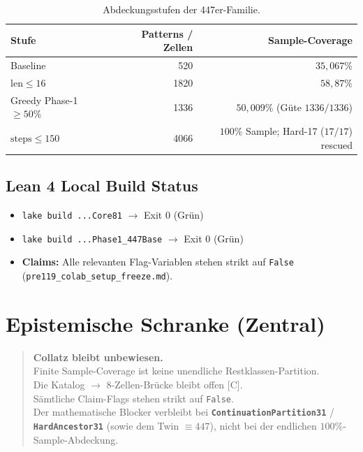 \documentclass[11pt,a4paper]{article}
\theoremstyle{definition}
\theoremstyle{remark}
\begin{document}
	\begin{table}[h!]
		\centering
		\begin{tabular}{l r r}
			\toprule
			\textbf{Stufe} & \textbf{Patterns / Zellen} & \textbf{Sample-Coverage} \\
			\midrule
			Baseline & 520 & \textbf{$35{,}067\%$} \\
			$\mathrm{len} \le 16$ & 1820 & \textbf{$58{,}87\%$} \\
			Greedy Phase-1 $\ge 50\%$ & 1336 & \textbf{$50{,}009\%$} (Güte $1336/1336$) \\
			$\mathrm{steps} \le 150$ & 4066 & \textbf{$100\%$} Sample; Hard-17 ($17/17$) rescued \\
			\bottomrule
		\end{tabular}
		\caption{Abdeckungsstufen der 447er-Familie.}
	\end{table}
	
	\subsection{Lean 4 Local Build Status}
	\begin{itemize}
		\item \texttt{lake build ...Core81} $\longrightarrow$ Exit 0 (Grün)
		\item \texttt{lake build ...Phase1\_447Base} $\longrightarrow$ Exit 0 (Grün)
		\item \textbf{Claims:} Alle relevanten Flag-Variablen stehen strikt auf \texttt{False} (\texttt{pre119\_colab\_setup\_freeze.md}).
	\end{itemize}
	
	\section{Epistemische Schranke (Zentral)}
	
	\begin{quote}
		\textbf{Collatz bleibt unbewiesen.} \\
		Finite Sample-Coverage ist keine unendliche Restklassen-Partition. \\
		Die Katalog $\to$ 8-Zellen-Brücke bleibt offen [C]. \\
		Sämtliche Claim-Flags stehen strikt auf \texttt{False}. \\
		Der mathematische Blocker verbleibt bei \textbf{\texttt{ContinuationPartition31}} / \textbf{\texttt{HardAncestor31}} (sowie dem Twin $\equiv 447$), nicht bei der endlichen $100\%$-Sample-Abdeckung.
	\end{quote}
	
\end{document}
